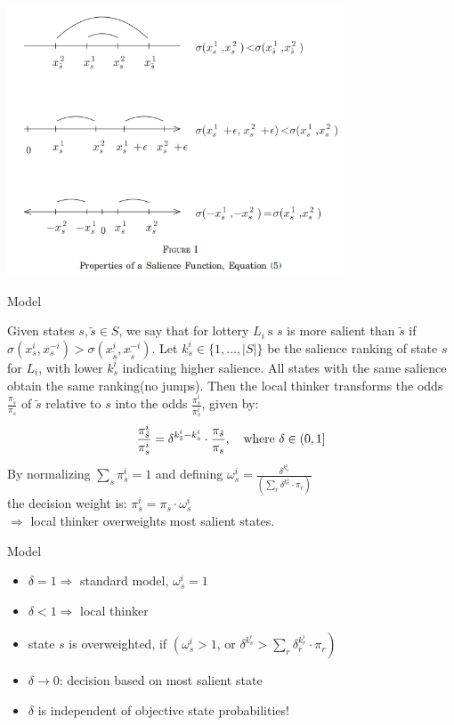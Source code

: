 \documentclass[11pt,aspectratio=169]{beamer}
\begin{document}
\begin{frame}
    \includegraphics[width = 0.75\textwidth]{fig1.png}
\end{frame}

\begin{frame}{Model}
    \begin{definition}[2]
        Given states $s, \tilde{s} \in S$, we say that for lottery $L_i \mathrm{~s}$ $s$ is more salient than $\tilde{s}$ if $\sigma\left(x_s^i, x_s^{-i}\right)>\sigma\left(x_{\tilde{s}}^i, x_{\tilde{s}}^{-i}\right)$. 
        Let $k_s^i \in\{1, \ldots,|S|\}$ be the salience ranking of state $s$ for $L_i$, with lower $k_s^i$ indicating higher salience. 
        All states with the same salience obtain the same ranking(no jumps). Then the local thinker transforms the odds $\frac{\pi_{\tilde{s}}}{\pi_s}$ of $\tilde{s}$ relative to $s$ into the odds $\frac{\pi_s^i}{\pi_s^i}$, given by:
        $$
        \frac{\pi_{\tilde{s}}^i}{\pi_s^i}=\delta^{k_{\tilde{s}}^i-k_s^i} \cdot \frac{\pi_{\tilde{s}}}{\pi_s}, \text{\quad where } \delta \in(0,1]
        $$
        By normalizing $\sum_s \pi_s^i=1$ and defining $\omega_s^i=\frac{\delta^{k_s^i}}{\left(\sum_r \delta^{k_r^i} \cdot \pi_r\right)}$ \\
        the decision weight is: $\pi_s^i=\pi_s \cdot \omega_s^i$\\
        $\Rightarrow$ local thinker overweights most salient states. 
    \end{definition}
\end{frame}

\begin{frame}{Model}
    \begin{itemize}
        \item $\delta=1 \Rightarrow$ standard model, $\omega_s^i=1$\medskip
        \item $\delta<1 \Rightarrow$ local thinker\medskip
        \item state $s$ is overweighted, if $\left(\omega_s^i>1\right.$, or $\left.\delta^{k_s^i}>\sum_r \delta_r^{k_r^i} \cdot \pi_r\right)$\medskip
        \item $\delta \rightarrow 0$: decision based on most salient state\medskip
        \item $\delta$ is independent of objective state probabilities!\medskip
    \end{itemize}
\end{frame}
\end{document}
